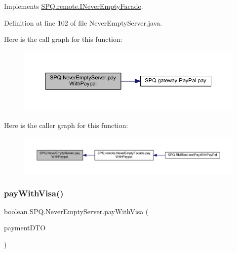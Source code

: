 Implements \mbox{\hyperlink{interface_s_p_q_1_1remote_1_1_i_never_empty_facade_a2d34c64f91537d8c7138094e418de785}{S\+P\+Q.\+remote.\+I\+Never\+Empty\+Facade}}.



Definition at line 102 of file Never\+Empty\+Server.\+java.

Here is the call graph for this function\+:
\nopagebreak
\begin{figure}[H]
\begin{center}
\leavevmode
\includegraphics[width=350pt]{class_s_p_q_1_1_never_empty_server_a954ea8c563055eae79564b357e557f85_cgraph}
\end{center}
\end{figure}
Here is the caller graph for this function\+:
\nopagebreak
\begin{figure}[H]
\begin{center}
\leavevmode
\includegraphics[width=350pt]{class_s_p_q_1_1_never_empty_server_a954ea8c563055eae79564b357e557f85_icgraph}
\end{center}
\end{figure}
\mbox{\label{class_s_p_q_1_1_never_empty_server_a455fa773e66917007842f9a92243ffa8}} 
\subsubsection{\texorpdfstring{pay\+With\+Visa()}{payWithVisa()}}
{\footnotesize\ttfamily boolean S\+P\+Q.\+Never\+Empty\+Server.\+pay\+With\+Visa (\begin{DoxyParamCaption}\item[{\mbox{\hyperlink{class_s_p_q_1_1dto_1_1_payment_d_t_o}{Payment\+D\+TO}}}]{payment\+D\+TO }\end{DoxyParamCaption})}



